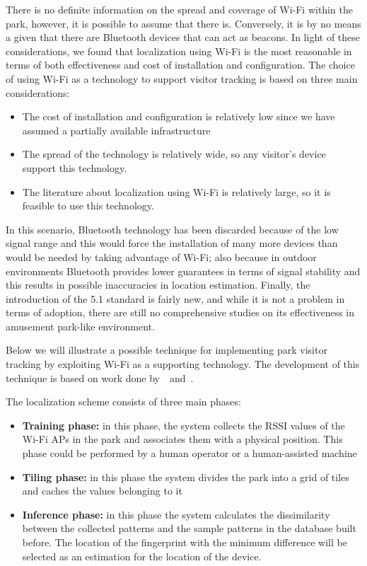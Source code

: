 There is no definite information on the spread and coverage of Wi-Fi within the park, however, it is possible to assume that there is. Conversely, it
is by no means a given that there are Bluetooth devices that can act as beacons. In light of these considerations, we found that localization using
Wi-Fi is the most reasonable in terms of both effectiveness and cost of installation and configuration. The choice of using Wi-Fi as a technology to
support visitor tracking is based on three main considerations:

\begin{itemize}
	\item The cost of installation and configuration is relatively low since we have assumed a partially available infrastructure
	\item The spread of the technology is relatively wide, so any visitor's device support this technology.
	\item The literature about localization using Wi-Fi is relatively large, so it is feasible to use this technology.
\end{itemize}

In this scenario, Bluetooth technology has been discarded because of the low signal range and this would force the installation of many more devices
than would be needed by taking advantage of Wi-Fi; also because in outdoor environments Bluetooth provides lower guarantees in terms of signal
stability and this results in possible inaccuracies in location estimation. Finally, the introduction of the 5.1 standard is fairly new, and while it
is not a problem in terms of adoption, there are still no comprehensive studies on its effectiveness in amusement park-like environment.

Below we will illustrate a possible technique for implementing park visitor tracking by exploiting Wi-Fi as a supporting technology. The development
of this technique is based on work done by~\cite{du2018hybrid}~and~\cite{chaudhry2013indoor}.

The localization scheme consists of three main phases:

\begin{itemize}
	\item \textbf{Training phase:} in this phase, the system collects the RSSI values of the Wi-Fi APs in the park and associates them with a
	      physical position. This phase could be performed by a human operator or a human-assisted machine
	\item \textbf{Tiling phase:} in this phase the system divides the park into a grid of tiles and caches the values belonging to it
	\item \textbf{Inference phase:} in this phase the system calculates the dissimilarity between the collected patterns and the sample
	      patterns in the database built before. The location of the fingerprint with the minimum difference will be selected as an estimation for the
	      location of the device.
\end{itemize}

